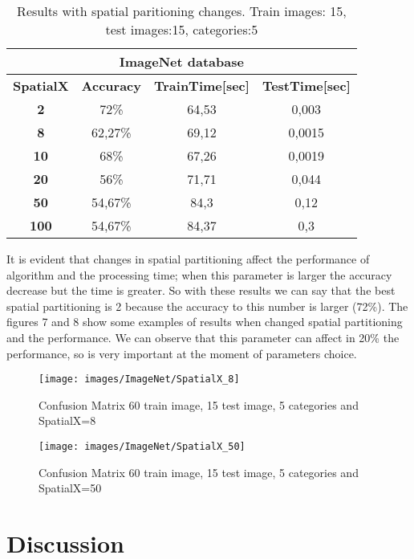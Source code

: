 \documentclass[10pt,twocolumn,letterpaper]{article}
\begin{document}
\begin{table}[H]
\centering
\caption{Results with spatial paritioning changes. Train images: 15, test images:15, categories:5 }
\label{my-label}
\begin{tabular}{|c|c|c|c|}
\hline
\multicolumn{4}{|c|}{\textbf{ImageNet database}} \\ \hline
\multicolumn{1}{|l|}{\textbf{SpatialX}} & \multicolumn{1}{l|}{\textbf{Accuracy}} & \multicolumn{1}{l|}{\textbf{TrainTime{[}sec{]}}} & \multicolumn{1}{l|}{\textbf{TestTime{[}sec{]}}} \\ \hline
\textbf{2} & 72\% & 64,53 & 0,003 \\ \hline
\textbf{8} & 62,27\% & 69,12 & 0,0015 \\ \hline
\textbf{10} & 68\% & 67,26 & 0,0019 \\ \hline
\textbf{20} & 56\% & 71,71 & 0,044 \\ \hline
\textbf{50} & 54,67\% & 84,3 & 0,12 \\ \hline
\textbf{100} & 54,67\% & 84,37 & 0,3 \\ \hline
\end{tabular}
\end{table}

It is evident that changes in spatial partitioning affect the performance of algorithm and the processing time; when this parameter is larger the accuracy decrease but the time is greater. So with these results we can say that the best spatial partitioning is 2 because the accuracy to this number is larger (72\%). The figures 7 and 8 show some examples of results when changed spatial partitioning and the performance. We can observe that this parameter can affect in 20\% the performance, so is very important at the moment of parameters choice. 

\begin{figure}[H]  \texttt{[image: images/ImageNet/SpatialX\_8]}\caption{Confusion Matrix 60 train image, 15 test image, 5 categories and SpatialX=8}\label{Comp}\end{figure}

\begin{figure}[H]  \texttt{[image: images/ImageNet/SpatialX\_50]}\caption{Confusion Matrix 60 train image, 15 test image, 5 categories and SpatialX=50}\label{Comp}\end{figure}

\section{Discussion}
\end{document}
